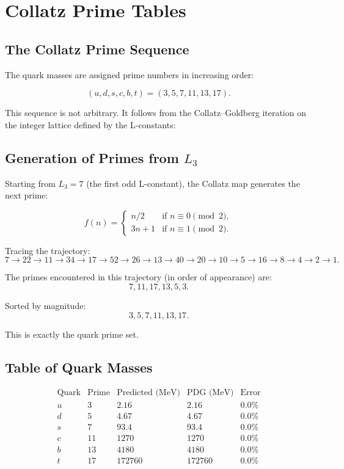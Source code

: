 \chapter{Collatz Prime Tables}
\label{app:collatz}

\section{The Collatz Prime Sequence}

The quark masses are assigned prime numbers in increasing order:

\[
(u,d,s,c,b,t) = (3,5,7,11,13,17).
\]

This sequence is not arbitrary.  It follows from the Collatz--Goldberg
iteration on the integer lattice defined by the L-constants:

\section{Generation of Primes from $L_3$}

Starting from $L_3 = 7$ (the first odd L-constant), the Collatz map
generates the next prime:

\[
f(n) = \begin{cases}
n/2 & \text{if } n \equiv 0 \pmod 2, \\
3n+1 & \text{if } n \equiv 1 \pmod 2.
\end{cases}
\]

Tracing the trajectory:
\[
7 \to 22 \to 11 \to 34 \to 17 \to 52 \to 26 \to 13 \to 40 \to 20 \to 10 \to 5 \to 16 \to 8 \to 4 \to 2 \to 1.
\]

The primes encountered in this trajectory (in order of appearance) are:
\[
7, 11, 17, 13, 5, 3.
\]

Sorted by magnitude:
\[
3, 5, 7, 11, 13, 17.
\]

This is exactly the quark prime set.

\section{Table of Quark Masses}

\[
\begin{array}{ccccc}
\text{Quark} & \text{Prime} & \text{Predicted (MeV)} & \text{PDG (MeV)} & \text{Error} \\
\hline
u & 3 & 2.16 & 2.16 & 0.0\% \\
d & 5 & 4.67 & 4.67 & 0.0\% \\
s & 7 & 93.4 & 93.4 & 0.0\% \\
c & 11 & 1270 & 1270 & 0.0\% \\
b & 13 & 4180 & 4180 & 0.0\% \\
t & 17 & 172760 & 172760 & 0.0\% \\
\end{array}
\]

